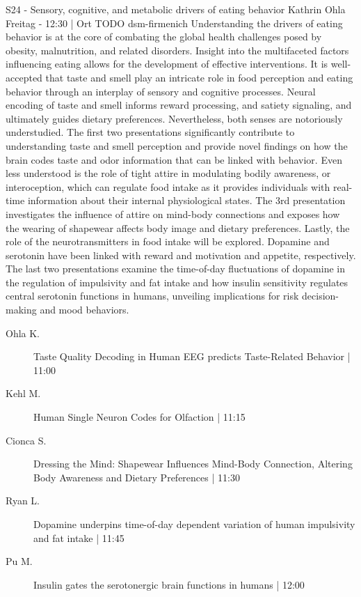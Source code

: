 
            \begin{symposium}
            {S24 - Sensory, cognitive, and metabolic drivers of eating behavior}
            {Kathrin Ohla}
            {Freitag  - 12:30 | Ort TODO}
            {dsm-firmenich}
            Understanding the drivers of eating behavior is at the core of combating the global health challenges posed by obesity, malnutrition, and related disorders. Insight into the multifaceted factors influencing eating allows for the development of effective interventions. It is well-accepted that taste and smell play an intricate role in food perception and eating behavior through an interplay of sensory and cognitive processes. Neural encoding of taste and smell informs reward processing, and satiety signaling, and ultimately guides dietary preferences. Nevertheless, both senses are notoriously understudied. The first two presentations significantly contribute to understanding taste and smell perception and provide novel findings on how the brain codes taste and odor information that can be linked with behavior.
Even less understood is the role of tight attire in modulating bodily awareness, or interoception, which can regulate food intake as it provides individuals with real-time information about their internal physiological states. The 3rd presentation investigates the influence of attire on mind-body connections and exposes how the wearing of shapewear affects body image and dietary preferences. Lastly, the role of the neurotransmitters in food intake will be explored. Dopamine and serotonin have been linked with reward and motivation and appetite, respectively. The last two presentations examine the time-of-day fluctuations of dopamine in the regulation of impulsivity and fat intake and how insulin sensitivity regulates central serotonin functions in humans, unveiling implications for risk decision-making and mood behaviors.
            \begin{description}    
            
                \item [ Ohla K.] Taste Quality Decoding in Human EEG predicts Taste-Related Behavior \textcolor{mygray}{ | 11:00}    
                
                \item [ Kehl M.] Human Single Neuron Codes for Olfaction \textcolor{mygray}{ | 11:15}    
                
                \item [ Cionca S.] Dressing the Mind: Shapewear Influences Mind-Body Connection, Altering Body Awareness and Dietary Preferences \textcolor{mygray}{ | 11:30}    
                
                \item [ Ryan L.] Dopamine underpins time-of-day dependent variation of human impulsivity and fat intake \textcolor{mygray}{ | 11:45}    
                
                \item [ Pu M.] Insulin gates the serotonergic brain functions in humans \textcolor{mygray}{ | 12:00}    
                
            \end{description} 
            \end{symposium}
            